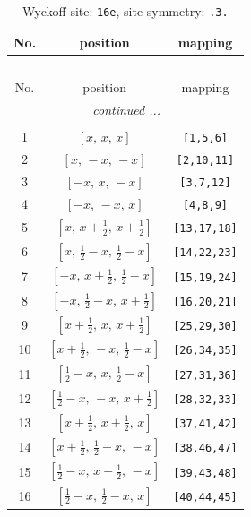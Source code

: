 \documentclass[fleqn,8pt]{jsarticle}
\begin{document}
\renewcommand{\arraystretch}{1.2}
\begin{longtable}{ccc}
\caption{Wyckoff site: {\tt 16e}, site symmetry: {\tt .3.}}
 \\
 \hline \hline
No. & position & mapping \\ \hline \endfirsthead

\multicolumn{2}{l}{\tablename\ \thetable{}} \\
 \hline \hline
No. & position & mapping \\ \hline \endhead

 \hline \hline
\multicolumn{2}{r}{\footnotesize\it continued ...} \\ \endfoot

 \hline \hline
\multicolumn{2}{r}{} \\ \endlastfoot

1 & $\left[ x,\, x,\, x \right]$ & {\tt [1,5,6]} \\ \hline
2 & $\left[ x,\, - x,\, - x \right]$ & {\tt [2,10,11]} \\ \hline
3 & $\left[ - x,\, x,\, - x \right]$ & {\tt [3,7,12]} \\ \hline
4 & $\left[ - x,\, - x,\, x \right]$ & {\tt [4,8,9]} \\ \hline
5 & $\left[ x,\, x + \frac{1}{2},\, x + \frac{1}{2} \right]$ & {\tt [13,17,18]} \\ \hline
6 & $\left[ x,\, \frac{1}{2} - x,\, \frac{1}{2} - x \right]$ & {\tt [14,22,23]} \\ \hline
7 & $\left[ - x,\, x + \frac{1}{2},\, \frac{1}{2} - x \right]$ & {\tt [15,19,24]} \\ \hline
8 & $\left[ - x,\, \frac{1}{2} - x,\, x + \frac{1}{2} \right]$ & {\tt [16,20,21]} \\ \hline
9 & $\left[ x + \frac{1}{2},\, x,\, x + \frac{1}{2} \right]$ & {\tt [25,29,30]} \\ \hline
10 & $\left[ x + \frac{1}{2},\, - x,\, \frac{1}{2} - x \right]$ & {\tt [26,34,35]} \\ \hline
11 & $\left[ \frac{1}{2} - x,\, x,\, \frac{1}{2} - x \right]$ & {\tt [27,31,36]} \\ \hline
12 & $\left[ \frac{1}{2} - x,\, - x,\, x + \frac{1}{2} \right]$ & {\tt [28,32,33]} \\ \hline
13 & $\left[ x + \frac{1}{2},\, x + \frac{1}{2},\, x \right]$ & {\tt [37,41,42]} \\ \hline
14 & $\left[ x + \frac{1}{2},\, \frac{1}{2} - x,\, - x \right]$ & {\tt [38,46,47]} \\ \hline
15 & $\left[ \frac{1}{2} - x,\, x + \frac{1}{2},\, - x \right]$ & {\tt [39,43,48]} \\ \hline
16 & $\left[ \frac{1}{2} - x,\, \frac{1}{2} - x,\, x \right]$ & {\tt [40,44,45]} \\
\end{longtable}
\end{document}

